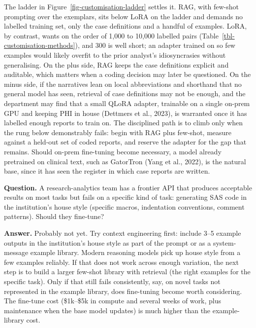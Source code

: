 \documentclass[
  letterpaper,
  11pt]{scrbook}
\begin{document}
The ladder in Figure~\ref{fig-customisation-ladder} settles it. RAG,
with few-shot prompting over the exemplars, sits below LoRA on the
ladder and demands no labelled training set, only the case definitions
and a handful of examples. LoRA, by contrast, wants on the order of
1,000 to 10,000 labelled pairs (Table~\ref{tbl-customisation-methods}),
and 300 is well short; an adapter trained on so few examples would
likely overfit to the prior analyst's idiosyncrasies without
generalising. On the plus side, RAG keeps the case definitions explicit
and auditable, which matters when a coding decision may later be
questioned. On the minus side, if the narratives lean on local
abbreviations and shorthand that no general model has seen, retrieval of
case definitions may not be enough, and the department may find that a
small QLoRA adapter, trainable on a single on-prem GPU and keeping PHI
in house (Dettmers et al., 2023), is warranted once it has labelled
enough reports to train on. The disciplined path is to climb only when
the rung below demonstrably fails: begin with RAG plus few-shot, measure
against a held-out set of coded reports, and reserve the adapter for the
gap that remains. Should on-prem fine-tuning become necessary, a model
already pretrained on clinical text, such as GatorTron ({Yang et al.},
2022), is the natural base, since it has seen the register in which case
reports are written.

\begin{tcolorbox}[enhanced jigsaw, arc=.35mm, bottomrule=.15mm, bottomtitle=1mm, breakable, colback=white, colbacktitle=quarto-callout-note-color!10!white, colframe=quarto-callout-note-color-frame, coltitle=black, left=2mm, leftrule=.75mm, opacityback=0, opacitybacktitle=0.6, rightrule=.15mm, title={Check your understanding: when to fine-tune}, titlerule=0mm, toprule=.15mm, toptitle=1mm]

\textbf{Question.} A research-analytics team has a frontier API that
produces acceptable results on most tasks but fails on a specific kind
of task: generating SAS code in the institution's house style (specific
macros, indentation conventions, comment patterns). Should they
fine-tune?

\textbf{Answer.} Probably not yet. Try context engineering first:
include 3--5 example outputs in the institution's house style as part of
the prompt or as a system-message example library. Modern reasoning
models pick up house style from a few examples reliably. If that does
not work across enough variation, the next step is to build a larger
few-shot library with retrieval (the right examples for the specific
task). Only if that still fails consistently, say, on novel tasks not
represented in the example library, does fine-tuning become worth
considering. The fine-tune cost (\$1k--\$5k in compute and several weeks
of work, plus maintenance when the base model updates) is much higher
than the example-library cost.

\end{tcolorbox}
\end{document}
